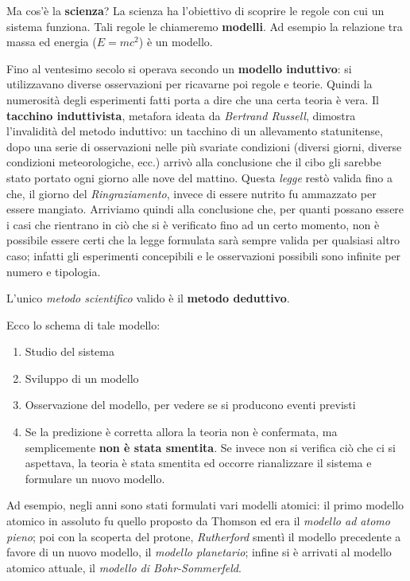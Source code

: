 \documentclass[11pt]{book}
\begin{document}
Ma cos'\`e la {\bf scienza}? La scienza ha l'obiettivo di scoprire le
regole con cui un sistema funziona. Tali regole le chiameremo {\bf
  modelli}. Ad esempio la relazione tra massa ed energia ($E = mc^2$)
\`e un modello.

Fino al ventesimo secolo si operava secondo un {\bf modello
  induttivo}: si utilizzavano diverse osservazioni per ricavarne poi
regole e teorie. Quindi la numerosit\`a degli esperimenti fatti porta
a dire che una certa teoria \`e vera. Il {\bf tacchino induttivista},
metafora ideata da {\em Bertrand Russell}, dimostra l'invalidit\`a del
metodo induttivo: un tacchino di un allevamento statunitense, dopo una
serie di osservazioni nelle pi\`u svariate condizioni (diversi giorni,
diverse condizioni meteorologiche, ecc.) arriv\`o alla conclusione che
il cibo gli sarebbe stato portato ogni giorno alle nove del
mattino. Questa {\em legge} rest\`o valida fino a che, il giorno
del {\em Ringraziamento}, invece di essere nutrito fu ammazzato per
essere mangiato. Arriviamo quindi alla conclusione che, per quanti
possano essere i casi che rientrano in ci\`o che si \`e verificato
fino ad un certo momento, non \`e possibile essere certi che la legge
formulata sar\`a sempre valida per qualsiasi altro caso; infatti gli
esperimenti concepibili e le osservazioni possibili sono infinite per
numero e tipologia.

L'unico {\em metodo scientifico} valido \`e il {\bf metodo deduttivo}. 

Ecco lo schema di tale modello:
\begin{enumerate}
\item Studio del sistema
\item Sviluppo di un modello
\item Osservazione del modello, per vedere se si producono eventi
  previsti
\item Se la predizione \`e corretta allora la teoria non \`e confermata,
  ma semplicemente {\bf non \`e stata smentita}. Se invece non si
  verifica ci\`o che ci si aspettava, la teoria \`e stata smentita ed
  occorre rianalizzare il sistema e formulare un nuovo modello.
\end{enumerate}

Ad esempio, negli anni sono stati formulati vari modelli atomici: il
primo modello atomico in assoluto fu quello proposto da Thomson ed era
il {\em modello ad atomo pieno}; poi con la scoperta del protone, {\em
  Rutherford} sment\`i il modello precedente a favore di un nuovo
modello, il {\em modello planetario}; infine si \`e arrivati al modello
atomico attuale, il {\em modello di Bohr-Sommerfeld}.
\end{document}

